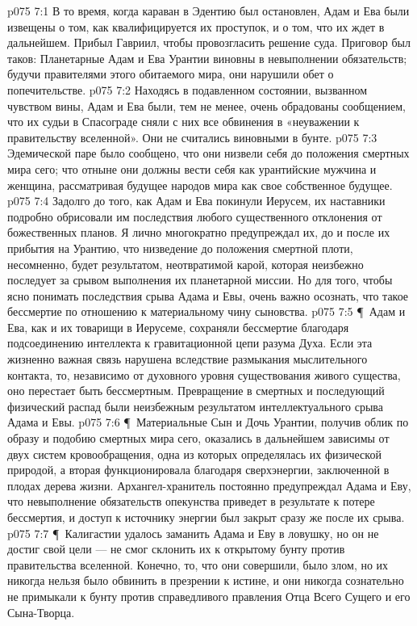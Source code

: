 \vs p075 7:1 В то время, когда караван в Эдентию был остановлен, Адам и Ева были извещены о том, как квалифицируется их проступок, и о том, что их ждет в дальнейшем. Прибыл Гавриил, чтобы провозгласить решение суда. Приговор был таков: Планетарные Адам и Ева Урантии виновны в невыполнении обязательств; будучи правителями этого обитаемого мира, они нарушили обет о попечительстве.
\vs p075 7:2 Находясь в подавленном состоянии, вызванном чувством вины, Адам и Ева были, тем не менее, очень обрадованы сообщением, что их судьи в Спасограде сняли с них все обвинения в «неуважении к правительству вселенной». Они не считались виновными в бунте.
\vs p075 7:3 Эдемической паре было сообщено, что они низвели себя до положения смертных мира сего; что отныне они должны вести себя как урантийские мужчина и женщина, рассматривая будущее народов мира как свое собственное будущее.
\vs p075 7:4 Задолго до того, как Адам и Ева покинули Иерусем, их наставники подробно обрисовали им последствия любого существенного отклонения от божественных планов. Я лично многократно предупреждал их, до и после их прибытия на Урантию, что низведение до положения смертной плоти, несомненно, будет результатом, неотвратимой карой, которая неизбежно последует за срывом выполнения их планетарной миссии. Но для того, чтобы ясно понимать последствия срыва Адама и Евы, очень важно осознать, что такое бессмертие по отношению к материальному чину сыновства.
\vs p075 7:5 \P\ \bibnobreakspace Адам и Ева, как и их товарищи в Иерусеме, сохраняли бессмертие благодаря подсоединению интеллекта к гравитационной цепи разума Духа. Если эта жизненно важная связь нарушена вследствие размыкания мыслительного контакта, то, независимо от духовного уровня существования живого существа, оно перестает быть бессмертным. Превращение в смертных и последующий физический распад были неизбежным результатом интеллектуального срыва Адама и Евы.
\vs p075 7:6 \P\ \bibnobreakspace Материальные Сын и Дочь Урантии, получив облик по образу и подобию смертных мира сего, оказались в дальнейшем зависимы от двух систем кровообращения, одна из которых определялась их физической природой, а вторая функционировала благодаря сверхэнергии, заключенной в плодах дерева жизни. Архангел\hyp{}хранитель постоянно предупреждал Адама и Еву, что невыполнение обязательств опекунства приведет в результате к потере бессмертия, и доступ к источнику энергии был закрыт сразу же после их срыва.
\vs p075 7:7 \P\ Калигастии удалось заманить Адама и Еву в ловушку, но он не достиг свой цели --- не смог склонить их к открытому бунту против правительства вселенной. Конечно, то, что они совершили, было злом, но их никогда нельзя было обвинить в презрении к истине, и они никогда сознательно не примыкали к бунту против справедливого правления Отца Всего Сущего и его Сына\hyp{}Творца.

